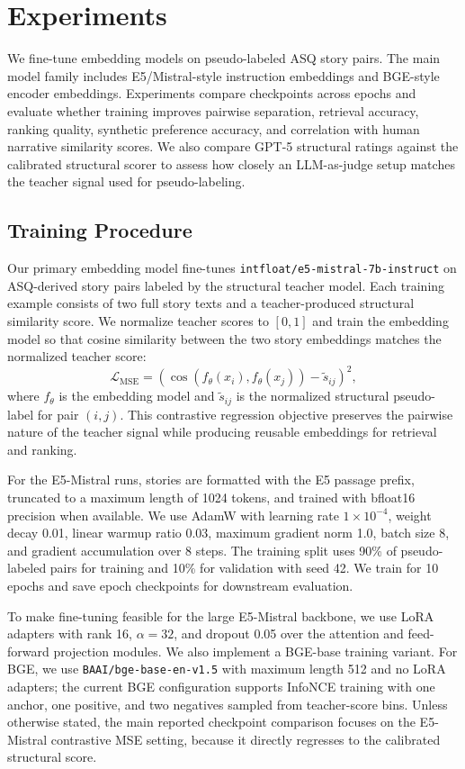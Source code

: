 \section{Experiments}

We fine-tune embedding models on pseudo-labeled ASQ story pairs. The main model family includes E5/Mistral-style instruction embeddings and BGE-style encoder embeddings. Experiments compare checkpoints across epochs and evaluate whether training improves pairwise separation, retrieval accuracy, ranking quality, synthetic preference accuracy, and correlation with human narrative similarity scores. We also compare GPT-5 structural ratings against the calibrated structural scorer to assess how closely an LLM-as-judge setup matches the teacher signal used for pseudo-labeling.

\subsection{Training Procedure}

Our primary embedding model fine-tunes \texttt{intfloat/e5-mistral-7b-instruct} on ASQ-derived story pairs labeled by the structural teacher model. Each training example consists of two full story texts and a teacher-produced structural similarity score. We normalize teacher scores to $[0,1]$ and train the embedding model so that cosine similarity between the two story embeddings matches the normalized teacher score:
\begin{equation}
\mathcal{L}_{\text{MSE}} =
\left(\cos(f_\theta(x_i), f_\theta(x_j)) - \tilde{s}_{ij}\right)^2,
\end{equation}
where $f_\theta$ is the embedding model and $\tilde{s}_{ij}$ is the normalized structural pseudo-label for pair $(i,j)$. This contrastive regression objective preserves the pairwise nature of the teacher signal while producing reusable embeddings for retrieval and ranking.

For the E5-Mistral runs, stories are formatted with the E5 passage prefix, truncated to a maximum length of 1024 tokens, and trained with bfloat16 precision when available. We use AdamW with learning rate $1\times10^{-4}$, weight decay 0.01, linear warmup ratio 0.03, maximum gradient norm 1.0, batch size 8, and gradient accumulation over 8 steps. The training split uses 90\% of pseudo-labeled pairs for training and 10\% for validation with seed 42. We train for 10 epochs and save epoch checkpoints for downstream evaluation.

To make fine-tuning feasible for the large E5-Mistral backbone, we use LoRA adapters with rank 16, $\alpha=32$, and dropout 0.05 over the attention and feed-forward projection modules. We also implement a BGE-base training variant. For BGE, we use \texttt{BAAI/bge-base-en-v1.5} with maximum length 512 and no LoRA adapters; the current BGE configuration supports InfoNCE training with one anchor, one positive, and two negatives sampled from teacher-score bins. Unless otherwise stated, the main reported checkpoint comparison focuses on the E5-Mistral contrastive MSE setting, because it directly regresses to the calibrated structural score.

